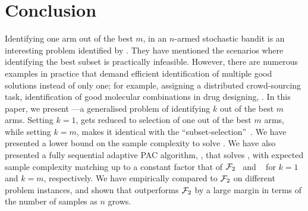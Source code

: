 \section{Conclusion}
\label{sec:conclusion}
Identifying one arm out of the best $m$, in an $n$-armed stochastic bandit
is an interesting problem identified by \citet{bib:arcsk2017}. They have
mentioned the scenarios where identifying the best subset is practically infeasible.
However, there are numerous examples in practice that demand efficient identification
of multiple good solutions instead of only one; for example, assigning a distributed crowd-sourcing task, identification of good molecular combinations in drug designing, \etc. 
In this paper, we present \QFK---a generalised problem of identifying $k$ out of the best $m$ arms. Setting $k=1$, \QFK gets reduced to selection of one out of the best $m$ arms, while
setting $k=m$, makes it identical with the ``subset-selection''~\cite{bib:explorem}. We
have presented a lower bound on the sample complexity
to solve \QFK. 
We have also presented a fully sequential adaptive PAC algorithm, \GLUCB,
that solves \QFK, with expected sample complexity matching up to a constant factor that of 
$\mathcal{F}_2$~\cite{bib:arcsk2017} and \LUCB~\cite{bib:lucb} for $k=1$ and $k=m$, respectively. We have empirically
compared \GLUCB to $\mathcal{F}_2$ on different problem instances, and
shown that \GLUCB outperforms $\mathcal{F}_2$ by a large margin in terms of the number of
samples as $n$ grows.

